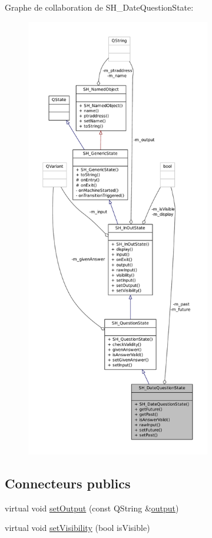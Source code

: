 Graphe de collaboration de S\-H\-\_\-\-Date\-Question\-State\-:
\nopagebreak
\begin{figure}[H]
\begin{center}
\leavevmode
\includegraphics[height=550pt]{classSH__DateQuestionState__coll__graph}
\end{center}
\end{figure}
\subsection*{Connecteurs publics}
\begin{DoxyCompactItemize}
\item 
virtual void \hyperlink{classSH__InOutState_a7dc244d72e09fdbc30eb3a704b05a4d8}{set\-Output} (const Q\-String \&\hyperlink{classSH__InOutState_a1a2fd4f34484125058e20730aaee7e46}{output})
\item 
virtual void \hyperlink{classSH__InOutState_a7706a2ea1367ab3416db27fa0f4794f7}{set\-Visibility} (bool is\-Visible)
\end{DoxyCompactItemize}
